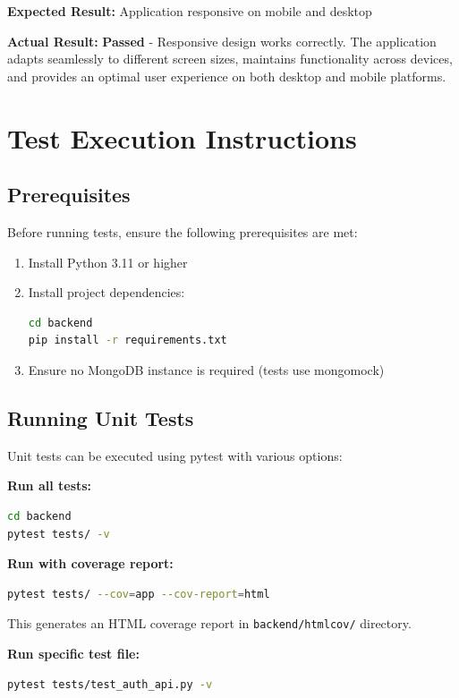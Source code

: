 \documentclass[12pt,a4paper]{report}
\begin{document}
\textbf{Expected Result:} Application responsive on mobile and desktop

\textbf{Actual Result:} \textbf{Passed} - Responsive design works correctly. The application adapts seamlessly to different screen sizes, maintains functionality across devices, and provides an optimal user experience on both desktop and mobile platforms.

\section{Test Execution Instructions}

\subsection{Prerequisites}

Before running tests, ensure the following prerequisites are met:

\begin{enumerate}
    \item Install Python 3.11 or higher
    \item Install project dependencies:
          \begin{lstlisting}[language=bash]
cd backend
pip install -r requirements.txt
    \end{lstlisting}
    \item Ensure no MongoDB instance is required (tests use mongomock)
\end{enumerate}

\subsection{Running Unit Tests}

Unit tests can be executed using pytest with various options:

\textbf{Run all tests:}
\begin{lstlisting}[language=bash]
cd backend
pytest tests/ -v
\end{lstlisting}

\textbf{Run with coverage report:}
\begin{lstlisting}[language=bash]
pytest tests/ --cov=app --cov-report=html
\end{lstlisting}
This generates an HTML coverage report in \texttt{backend/htmlcov/} directory.

\textbf{Run specific test file:}
\begin{lstlisting}[language=bash]
pytest tests/test_auth_api.py -v
\end{lstlisting}
\end{document}

